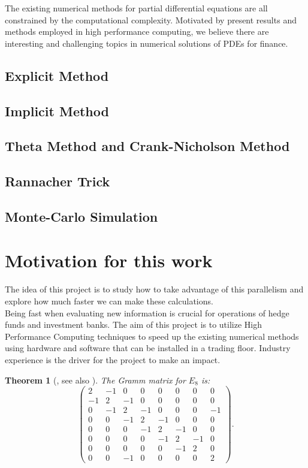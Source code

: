 \documentclass[12pt, oneside]{book}
\theoremstyle{plain}
\newtheorem{theorem}{Theorem}[section]
\theoremstyle{definition}
\begin{document}
The existing numerical methods for partial differential equations are all constrained by the computational complexity. Motivated by present results and methods employed in high performance computing, we believe there are interesting and challenging topics in numerical solutions of PDEs for finance.

\subsection{Explicit Method}

\subsection{Implicit Method}

\subsection{Theta Method and Crank-Nicholson Method}

\subsection{Rannacher Trick}

\subsection{Monte-Carlo Simulation}


\section{Motivation for this work}
The idea of this project is to study how to take advantage of this parallelism and explore how much faster we can make these calculations.
\\
Being fast when evaluating new information is crucial for operations of hedge funds and investment banks. The aim of this project is to utilize High Performance Computing techniques to speed up the existing numerical methods using hardware and software that can be installed in a trading floor. Industry experience is the driver for the project to make an impact.

\begin{theorem}[{\cite[Theorem 2.3]{Petri}, see also \cite[pg. 45]{BlackScholes}}]\label{PetriTheorem}
The Gramm matrix for $E_8$ is:
$$
\begin{pmatrix}
2	&-1&0	&0	&0	&0	&0	&0\\
-1	&2	&-1	&0	&0	&0	&0	&0\\
0	&-1	&2	&-1	&0	&0	&0	&-1\\
0	&0	&-1	&2	&-1	&0	&0	&0\\
0	&0	&0	&-1	&2	&-1	&0	&0\\
0	&0	&0	&0	&-1	&2	&-1	&0\\
0	&0	&0	&0	&0	&-1	&2	&0\\
0	&0	&-1	&0	&0	&0	&0	&2
\end{pmatrix}.
$$
\end{theorem}
\end{document}
